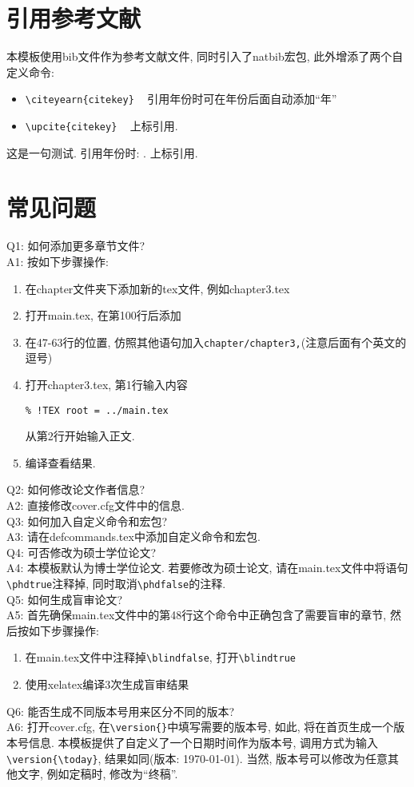 \section{引用参考文献}
本模板使用bib文件作为参考文献文件, 同时引入了natbib宏包, 此外增添了两个自定义命令:
\begin{itemize}
\item \verb|\citeyearn{citekey}|  ~  引用年份时可在年份后面自动添加``年''
\item \verb|\upcite{citekey}| ~ 上标引用.
\end{itemize}

这是一句测试\cite{Hazay_2010_Efficient}. 引用年份时: . 上标引用.

\section{常见问题}
Q1: 如何添加更多章节文件?\\
A1: 按如下步骤操作:
\begin{enumerate}
\item 在chapter文件夹下添加新的tex文件, 例如chapter3.tex
\item 打开main.tex, 在第100行后添加\verb||
\item 在47-63行的位置, 仿照其他语句加入\verb|chapter/chapter3,|(注意后面有个英文的逗号)
\item 打开chapter3.tex, 第1行输入内容
\begin{verbatim}
% !TEX root = ../main.tex
\end{verbatim}
从第2行开始输入正文.
\item 编译查看结果.
\end{enumerate}

Q2: 如何修改论文作者信息?\\
A2: 直接修改cover.cfg文件中的信息.\\

Q3: 如何加入自定义命令和宏包?\\
A3: 请在defcommands.tex中添加自定义命令和宏包.\\

Q4: 可否修改为硕士学位论文?\\
A4: 本模板默认为博士学位论文. 若要修改为硕士论文, 请在main.tex文件中将语句\verb|\phdtrue|注释掉, 同时取消\verb|\phdfalse|的注释. \\

Q5: 如何生成盲审论文?\\
A5: 首先确保main.tex文件中的第48行这个\verb||命令中正确包含了需要盲审的章节, 然后按如下步骤操作:
\begin{enumerate}
\item 在main.tex文件中注释掉\verb|\blindfalse|, 打开\verb|\blindtrue|
\item 使用xelatex编译3次生成盲审结果
\end{enumerate}

Q6: 能否生成不同版本号用来区分不同的版本?\\
A6: 打开cover.cfg, 在\verb|\version{}|中填写需要的版本号, 如此, 将在首页生成一个版本号信息. 本模板提供了自定义了一个日期时间作为版本号, 调用方式为输入\verb|\version{\today}|, 结果如同(版本: \today). 当然, 版本号可以修改为任意其他文字, 例如定稿时, 修改为``终稿''.
